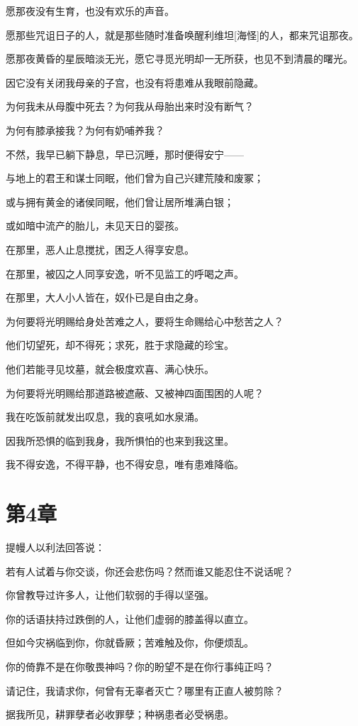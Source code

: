 \documentclass[12pt,oneside]{book}
\begin{document}
愿那夜没有生育，也没有欢乐的声音。

愿那些咒诅日子的人，就是那些随时准备唤醒利维坦[海怪]的人，都来咒诅那夜。

愿那夜黄昏的星辰暗淡无光，愿它寻觅光明却一无所获，也见不到清晨的曙光。

因它没有关闭我母亲的子宫，也没有将患难从我眼前隐藏。

为何我未从母腹中死去？为何我从母胎出来时没有断气？

为何有膝承接我？为何有奶哺养我？

不然，我早已躺下静息，早已沉睡，那时便得安宁——

与地上的君王和谋士同眠，他们曾为自己兴建荒陵和废冢；

或与拥有黄金的诸侯同眠，他们曾让居所堆满白银；

或如暗中流产的胎儿，未见天日的婴孩。

在那里，恶人止息搅扰，困乏人得享安息。

在那里，被囚之人同享安逸，听不见监工的呼喝之声。

在那里，大人小人皆在，奴仆已是自由之身。

为何要将光明赐给身处苦难之人，要将生命赐给心中愁苦之人？

他们切望死，却不得死；求死，胜于求隐藏的珍宝。

他们若能寻见坟墓，就会极度欢喜、满心快乐。

为何要将光明赐给那道路被遮蔽、又被神四面围困的人呢？

我在吃饭前就发出叹息，我的哀吼如水泉涌。

因我所恐惧的临到我身，我所惧怕的也来到我这里。

我不得安逸，不得平静，也不得安息，唯有患难降临。


\chapter{第4章}
提幔人以利法回答说：

若有人试着与你交谈，你还会悲伤吗？然而谁又能忍住不说话呢？

你曾教导过许多人，让他们软弱的手得以坚强。

你的话语扶持过跌倒的人，让他们虚弱的膝盖得以直立。

但如今灾祸临到你，你就昏厥；苦难触及你，你便烦乱。

你的倚靠不是在你敬畏神吗？你的盼望不是在你行事纯正吗？

请记住，我请求你，何曾有无辜者灭亡？哪里有正直人被剪除？

据我所见，耕罪孽者必收罪孽；种祸患者必受祸患。
\end{document}
